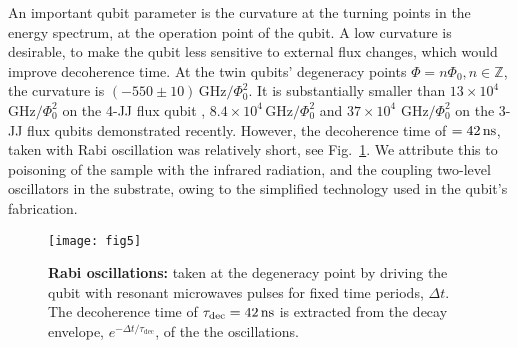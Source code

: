 An  important qubit  parameter is  the curvature  at the  turning points  in the
energy  spectrum, at  the operation  point  of the  qubit.  A  low curvature  is
desirable, to  make the  qubit less  sensitive to  external flux  changes, which
would  improve  decoherence  time.   At   the  twin  qubits'  degeneracy  points
$      \Phi     =      n\Phi_0,     n\in\mathbb{Z}      $,     the      curvature     is
$   (-550\pm10)\,\text{GHz}/\Phi_0^2  $.    It   is   substantially  smaller   than
$  13\times  10^4$ $  \text{GHz}/\Phi_0^2$  on  the  4-JJ flux  qubit  \cite{stern2014},
$   8.4  \times   10^4\,   \text{GHz}/\Phi_0^2$  \cite{zhu2010}   and   $  37\times   10^{4}$
$ \text{GHz}/\Phi_0^2$  \cite{gustavsson2012} on the 3-JJ  flux qubits demonstrated
recently.  However,  the decoherence time  of $  = 42\,\text{ns} $,  taken with
Rabi  oscillation   \cite{Bylander2011,Ithier2005,Martinis2003}  was  relatively
short, see  Fig.~\ref{fig:rabi}.  We attribute  this to poisoning of  the sample
with  the infrared  radiation, and  the  coupling two-level  oscillators in  the
substrate, owing to the simplified technology used in the qubit's fabrication.

\begin{figure}[h]
  \texttt{[image: fig5]}
  \caption{\textbf{Rabi oscillations:} taken at  the degeneracy point by driving
    the  qubit  with   resonant  microwaves  pulses  for   fixed  time  periods,
    $       \Delta       t       $.         The       decoherence       time       of
    $ \tau_{\text{dec}}  = 42\,\text{ns} $  is extracted from the  decay envelope,
    $ e^{-\Delta t/\tau_{\text{dec}}} $, of the the oscillations. \label{fig:rabi}}
\end{figure}

